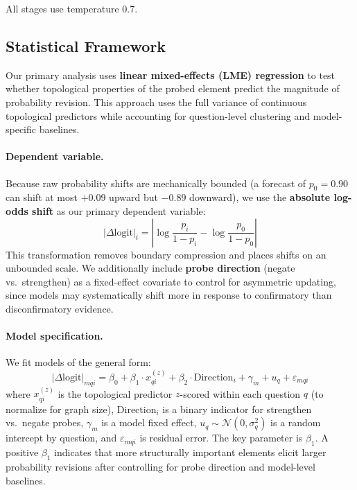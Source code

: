 \documentclass[11pt]{article}
\begin{document}
All stages use temperature 0.7.

\subsection{Statistical Framework}
\label{sec:metrics}

Our primary analysis uses \textbf{linear mixed-effects (LME) regression} to test whether topological properties of the probed element predict the magnitude of probability revision. This approach uses the full variance of continuous topological predictors while accounting for question-level clustering and model-specific baselines.

\paragraph{Dependent variable.}
Because raw probability shifts are mechanically bounded (a forecast of $p_0 = 0.90$ can shift at most $+0.09$ upward but $-0.89$ downward), we use the \textbf{absolute log-odds shift} as our primary dependent variable:
\begin{equation}
    |\Delta\text{logit}|_i = \left| \log\frac{p_i}{1-p_i} - \log\frac{p_0}{1-p_0} \right|
\end{equation}
This transformation removes boundary compression and places shifts on an unbounded scale. We additionally include \textbf{probe direction} (negate vs.\ strengthen) as a fixed-effect covariate to control for asymmetric updating, since models may systematically shift more in response to confirmatory than disconfirmatory evidence.

\paragraph{Model specification.}
We fit models of the general form:
\begin{equation}
    |\Delta\text{logit}|_{mqi} = \beta_0 + \beta_1 \cdot x_{qi}^{(z)} + \beta_2 \cdot \text{Direction}_i + \gamma_m + u_q + \varepsilon_{mqi}
\end{equation}
where $x_{qi}^{(z)}$ is the topological predictor $z$-scored within each question $q$ (to normalize for graph size), $\text{Direction}_i$ is a binary indicator for strengthen vs.\ negate probes, $\gamma_m$ is a model fixed effect, $u_q \sim \mathcal{N}(0, \sigma_q^2)$ is a random intercept by question, and $\varepsilon_{mqi}$ is residual error. The key parameter is $\beta_1$. A positive $\beta_1$ indicates that more structurally important elements elicit larger probability revisions after controlling for probe direction and model-level baselines.
\end{document}
